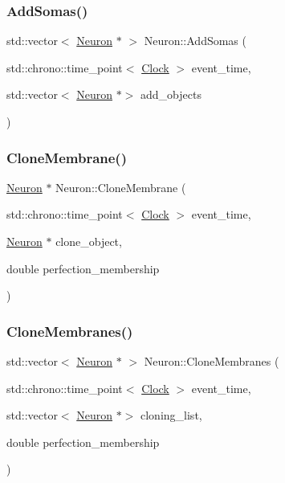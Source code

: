 \mbox{\label{classNeuron_a78a0f48a669b6ea20280829304e51de2}} 
\subsubsection{\texorpdfstring{Add\+Somas()}{AddSomas()}}
{\footnotesize\ttfamily std\+::vector$<$ \mbox{\hyperlink{classNeuron}{Neuron}} $\ast$ $>$ Neuron\+::\+Add\+Somas (\begin{DoxyParamCaption}\item[{std\+::chrono\+::time\+\_\+point$<$ \mbox{\hyperlink{universe_8h_a0ef8d951d1ca5ab3cfaf7ab4c7a6fd80}{Clock}} $>$}]{event\+\_\+time,  }\item[{std\+::vector$<$ \mbox{\hyperlink{classNeuron}{Neuron}} $\ast$$>$}]{add\+\_\+objects }\end{DoxyParamCaption})}

\mbox{\label{classNeuron_ab85f7c42466657095efb3aca5a9ee71d}} 
\subsubsection{\texorpdfstring{Clone\+Membrane()}{CloneMembrane()}}
{\footnotesize\ttfamily \mbox{\hyperlink{classNeuron}{Neuron}} $\ast$ Neuron\+::\+Clone\+Membrane (\begin{DoxyParamCaption}\item[{std\+::chrono\+::time\+\_\+point$<$ \mbox{\hyperlink{universe_8h_a0ef8d951d1ca5ab3cfaf7ab4c7a6fd80}{Clock}} $>$}]{event\+\_\+time,  }\item[{\mbox{\hyperlink{classNeuron}{Neuron}} $\ast$}]{clone\+\_\+object,  }\item[{double}]{perfection\+\_\+membership }\end{DoxyParamCaption})}

\mbox{\label{classNeuron_ae119d77522a4f11f5d9b1e935a9c80ba}} 
\subsubsection{\texorpdfstring{Clone\+Membranes()}{CloneMembranes()}}
{\footnotesize\ttfamily std\+::vector$<$ \mbox{\hyperlink{classNeuron}{Neuron}} $\ast$ $>$ Neuron\+::\+Clone\+Membranes (\begin{DoxyParamCaption}\item[{std\+::chrono\+::time\+\_\+point$<$ \mbox{\hyperlink{universe_8h_a0ef8d951d1ca5ab3cfaf7ab4c7a6fd80}{Clock}} $>$}]{event\+\_\+time,  }\item[{std\+::vector$<$ \mbox{\hyperlink{classNeuron}{Neuron}} $\ast$$>$}]{cloning\+\_\+list,  }\item[{double}]{perfection\+\_\+membership }\end{DoxyParamCaption})}

